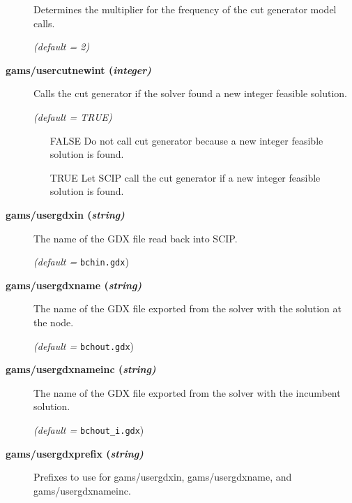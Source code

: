 \begin{description}
Determines the multiplier for the frequency of the cut generator model calls.

\textsl{(default = 2)}

\item[\label{scipusercutnewint}\hypertarget{scipusercutnewint}
{\textbf{gams/usercutnewint (\slshape{integer})}}]\hspace{1.0in}

Calls the cut generator if the solver found a new integer feasible solution.

\textsl{(default = TRUE)}
\begin{itemize}
\item[FALSE] Do not call cut generator because a new integer feasible solution is found.
\item[TRUE] Let SCIP call the cut generator if a new integer feasible solution is found.
\end{itemize}

\item[\label{scipusergdxin}\hypertarget{scipusergdxin}
{\textbf{gams/usergdxin (\slshape{string})}}]\hspace{1.0in}

The name of the GDX file read back into SCIP.

\textsl{(default =} \verb=bchin.gdx=)

\item[\label{scipusergdxname}\hypertarget{scipusergdxname}
{\textbf{gams/usergdxname (\slshape{string})}}]\hspace{1.0in}

The name of the GDX file exported from the solver with the solution at the node.

\textsl{(default =} \verb=bchout.gdx=)

\item[\label{scipusergdxnameinc}\hypertarget{scipusergdxnameinc}
{\textbf{gams/usergdxnameinc (\slshape{string})}}]\hspace{1.0in}

The name of the GDX file exported from the solver with the incumbent solution.

\textsl{(default =} \verb=bchout_i.gdx=)

\item[\label{scipusergdxprefix}\hypertarget{scipusergdxprefix}
{\textbf{gams/usergdxprefix (\slshape{string})}}]\hspace{1.0in}

Prefixes to use for gams/usergdxin, gams/usergdxname, and gams/usergdxnameinc.



\end{description}

